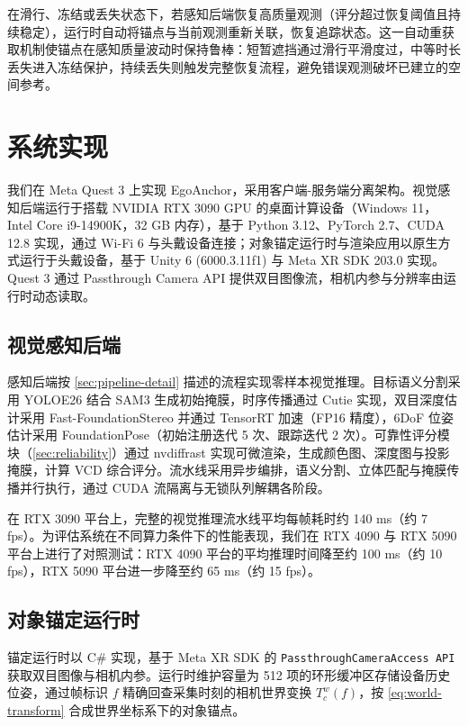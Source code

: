 \documentclass[review]{vgtc}
\begin{document}
在滑行、冻结或丢失状态下，若感知后端恢复高质量观测（评分超过恢复阈值且持续稳定），运行时自动将锚点与当前观测重新关联，恢复追踪状态。这一自动重获取机制使锚点在感知质量波动时保持鲁棒：短暂遮挡通过滑行平滑度过，中等时长丢失进入冻结保护，持续丢失则触发完整恢复流程，避免错误观测破坏已建立的空间参考。

\section{系统实现}\label{sec:impl}


我们在 Meta Quest 3 上实现 EgoAnchor，采用客户端-服务端分离架构。视觉感知后端运行于搭载 NVIDIA RTX 3090 GPU 的桌面计算设备（Windows 11，Intel Core i9-14900K，32 GB 内存），基于 Python 3.12、PyTorch 2.7、CUDA 12.8 实现，通过 Wi-Fi 6 与头戴设备连接；对象锚定运行时与渲染应用以原生方式运行于头戴设备，基于 Unity 6 (6000.3.11f1) 与 Meta XR SDK 203.0 实现。Quest 3 通过 Passthrough Camera API 提供双目图像流，相机内参与分辨率由运行时动态读取。

\subsection{视觉感知后端}


感知后端按 \ref{sec:pipeline-detail} 描述的流程实现零样本视觉推理。目标语义分割采用 YOLOE26 结合 SAM3 生成初始掩膜，时序传播通过 Cutie 实现，双目深度估计采用 Fast-FoundationStereo 并通过 TensorRT 加速（FP16 精度），6DoF 位姿估计采用 FoundationPose（初始注册迭代 5 次、跟踪迭代 2 次）。可靠性评分模块（\ref{sec:reliability}）通过 nvdiffrast 实现可微渲染，生成颜色图、深度图与投影掩膜，计算 VCD 综合评分。流水线采用异步编排，语义分割、立体匹配与掩膜传播并行执行，通过 CUDA 流隔离与无锁队列解耦各阶段。

在 RTX 3090 平台上，完整的视觉推理流水线平均每帧耗时约 140 ms（约 7 fps）。为评估系统在不同算力条件下的性能表现，我们在 RTX 4090 与 RTX 5090 平台上进行了对照测试：RTX 4090 平台的平均推理时间降至约 100 ms（约 10 fps），RTX 5090 平台进一步降至约 65 ms（约 15 fps）。

\subsection{对象锚定运行时}


锚定运行时以 C\# 实现，基于 Meta XR SDK 的 \texttt{PassthroughCameraAccess API} 获取双目图像与相机内参。运行时维护容量为 512 项的环形缓冲区存储设备历史位姿，通过帧标识 $f$ 精确回查采集时刻的相机世界变换 $T_c^w (f)$，按 \ref{eq:world-transform} 合成世界坐标系下的对象锚点。
\end{document}
